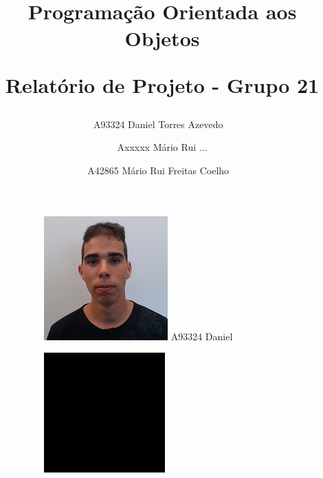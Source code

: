 \documentclass[11pt]{article}
\date{\vspace{-5ex}}
\title{Programação Orientada aos Objetos

Relatório de Projeto - Grupo 21}
\author{
	A93324 Daniel Torres Azevedo  \
	\and
	Axxxxx Mário Rui ...
	\and
	A42865 Mário Rui Freitas Coelho \
}
\begin{document}
\maketitle

\begin{figure}[h!]
	\centering
	\begin{subfigure}[h!]{0.3\linewidth}
		\centering
		\includegraphics[width=\linewidth]{Daniel.jpeg}
		A93324 Daniel
	\end{subfigure}%
	\begin{subfigure}[h!]{0.3\linewidth}
		\centering
		\includegraphics[width=\linewidth]{Mario.jpeg}

\end{subfigure}
\end{figure}
\end{document}

